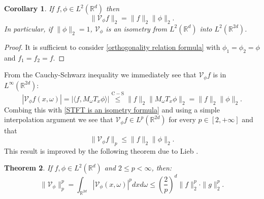 \documentclass[corpo=11pt, stile=classica, tipotesi=custom,
greek, evenboxes, english]{toptesi}
\numberwithin{equation}{chapter}
\newtheorem{teo}{Theorem}[chapter] %
\newtheorem{cor}[teo]{Corollary}
\theoremstyle{definition}
\theoremstyle{remark}
\newcommand{\R}{\mathbb{R}} %
\newcommand{\V}{\mathcal{V}} %
\begin{document}
\begin{cor}
	If $f, \phi \in L^2(\R^d)$ then
	\begin{equation}\label{STFT is an isometry formula}
		\| \V_{\phi} f\|_2 = \| f \|_2 \| \phi \|_2.
	\end{equation} 
	In particular, if $\| \phi \|_2 = 1$, $\V_{\phi}$ is an isometry from $L^2(\R^d)$ into $L^2(\R^{2d})$.
\end{cor}
\begin{proof}
	It is sufficient to consider \eqref{orthogonality relation formula} with $\phi_1 = \phi_2 = \phi$ and $f_1 = f_2 = f$.
\end{proof}
From the Cauchy-Schwarz inequality we immediately see that $\V_{\phi} f$ is in $L^{\infty}(\R^{2d})$:
\begin{equation}\label{STFT is bounded}
	|\V_{\phi} f(x,\omega)| = |\langle f, M_{\omega} T_x \phi\rangle| \overset{\mathrm{C-S}}{\leq} \|f\|_2 \|M_{\omega}T_x \phi\|_2 = \|f\|_2 \|\phi\|_2.
\end{equation}
Combing this with \eqref{STFT is an isometry formula} and using a simple interpolation argument we see that $\V_{\phi}f \in L^p(\R^{2d})$ for every $p \in [2,+\infty]$ and that 
\begin{equation}\label{STFT is in L^p for p>=2}
	\|\V_{\phi}f\|_p \leq \|f\|_2 \|\phi\|_2.
\end{equation}
This result is improved by the following theorem due to Lieb \cite{lieb_integral}.
\begin{teo}\label{Lieb's inequality}
	If $f,\phi \in L^2(\R^d)$ and $2 \leq p < \infty$, then:
	\begin{equation}\label{Lieb's inequality formula}
		\| \V_{\phi} \|_p^p = \int_{\R^{2d}} |\V_{\phi}(x,\omega)|^p dxd\omega \leq \left(\dfrac{2}{p}\right)^d \|f\|_2^p \cdot \|g\|_2^p.
	\end{equation}
\end{teo}
\end{document}
